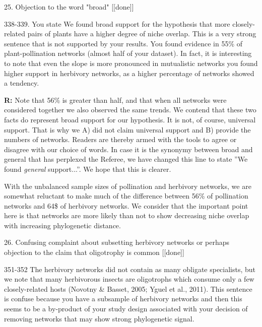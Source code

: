 \documentclass[12pt]{letter}
\newenvironment{refquote}{\bigskip \begin{it}}{\end{it}\smallskip}
\begin{document}
	25. Objection to the word "broad" [[done]]

		\begin{refquote}
			338-339. You state We found broad support for the hypothesis that more closely-related pairs of plants have a higher degree of niche overlap. This is a very strong sentence that is not supported by your results. You found evidence in 55\% of plant-pollination networks (almost half of your dataset). In fact, it is interesting to note that even the slope is more pronounced in mutualistic networks you found higher support in herbivory networks, as a higher percentage of networks showed a tendency.
		\end{refquote}


		\textbf{R:} Note that 56\% is greater than half, and that when all networks were considered together we also observed the same trends. We contend that these two facts do represent broad support for our hypothesis. It is not, of course, universal support. That is why we A) did not claim universal support and B) provide the numbers of networks. Readers are thereby armed with the tools to agree or disagree with our choice of words. In case it is the synonymy between broad and general that has perplexed the Referee, we have changed this line to state ''We found \emph{general} support...''. We hope that this is clearer.


		With the unbalanced sample sizes of pollination and herbivory networks, we are somewhat reluctant to make much of the difference between 56\% of pollination networks and 64\$ of herbivory networks. We consider that the important point here is that networks are more likely than not to show decreasing niche overlap with increasing phylogenetic distance. 


	26. Confusing complaint about subsetting herbivory networks or perhaps objection to the claim that oligotrophy is common [[done]]

		\begin{refquote}
			351-352 The herbivory networks did not contain as many obligate specialists, but we note that many herbivorous insects are oligotrophs which consume only a few closely-related hosts (Novotny \& Basset, 2005; Yguel et al., 2011). This sentence is confuse because you have a subsample of herbivory networks and then this seems to be a by-product of your study design associated with your decision of removing networks that may show strong phylogenetic signal.
		\end{refquote}
\end{document}
